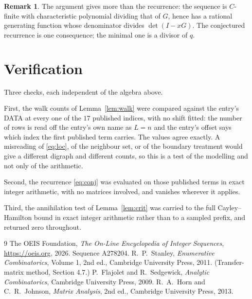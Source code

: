\documentclass[11pt,a4paper]{article}
\theoremstyle{plain}
\theoremstyle{definition}
\newtheorem{remark}[theorem]{Remark}
\begin{document}
\begin{remark}
The argument gives more than the recurrence: the sequence is $C$-finite with characteristic
polynomial dividing that of $G$, hence has a rational generating function whose denominator
divides $\det(I-xG)$. The conjectured recurrence is one consequence; the minimal one is a
divisor of $q$.
\end{remark}

\section{Verification}

Three checks, each independent of the algebra above.

First, the walk counts of Lemma~\ref{lem:walk} were compared against the entry's DATA at
every one of the $17$ published indices, with no shift fitted: the number of rows is
read off the entry's own name as $L=n$ and the entry's offset says which index the first
published term carries. The values agree exactly. A misreading of \eqref{eq:loc}, of the
neighbour set, or of the boundary treatment would give a different digraph and different
counts, so this is a test of the modelling and not only of the arithmetic.

Second, the recurrence \eqref{eq:conj} was evaluated on those published terms in exact
integer arithmetic, with no matrices involved, and vanishes wherever it applies.

Third, the annihilation test of Lemma~\ref{lem:crit} was carried to the full
Cayley--Hamilton bound in exact integer arithmetic rather than to a sampled prefix, and
returned zero throughout.

\begin{thebibliography}{9}
 The OEIS Foundation, \emph{The On-Line Encyclopedia of Integer
Sequences}, \url{https://oeis.org}, 2026. Sequence A278204.
 R.~P.~Stanley, \emph{Enumerative Combinatorics}, Volume 1, 2nd ed.,
Cambridge University Press, 2011. (Transfer-matrix method, Section 4.7.)
 P.~Flajolet and R.~Sedgewick, \emph{Analytic Combinatorics}, Cambridge
University Press, 2009.
 R.~A.~Horn and C.~R.~Johnson, \emph{Matrix Analysis}, 2nd ed., Cambridge
University Press, 2013.
\end{thebibliography}
\end{document}
